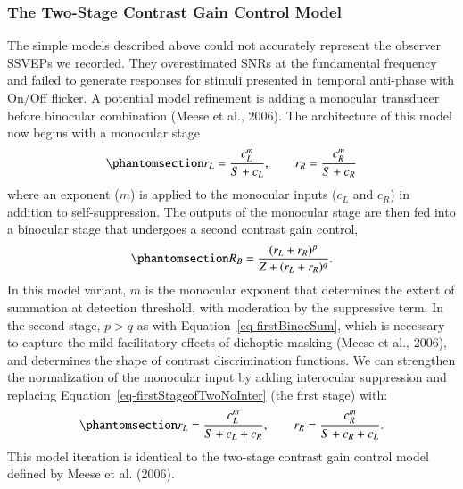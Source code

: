 \documentclass[review,
  12pt,
]{elsarticle}
\begin{document}
\subsubsection{The Two-Stage Contrast Gain Control
Model}\label{the-two-stage-contrast-gain-control-model}

The simple models described above could not accurately represent the
observer SSVEPs we recorded. They overestimated SNRs at the fundamental
frequency and failed to generate responses for stimuli presented in
temporal anti-phase with On/Off flicker. A potential model refinement is
adding a monocular transducer before binocular combination (Meese et
al., 2006). The architecture of this model now begins with a monocular
stage \begin{equation}\phantomsection\label{eq-firstStageofTwoNoInter}{
r_L = \frac{c_L^m}{S + c_L}, \qquad r_R = \frac{c_R^m}{S + c_R}
}\end{equation} where an exponent (\(m\)) is applied to the monocular
inputs (\(c_L\) and \(c_R\)) in addition to self-suppression. The
outputs of the monocular stage are then fed into a binocular stage that
undergoes a second contrast gain control,
\begin{equation}\phantomsection\label{eq-binocComb}{
R_{B} = \frac{(r_L+r_R)^p}{Z+(r_L+r_R)^q}.
}\end{equation} In this model variant, \(m\) is the monocular exponent
that determines the extent of summation at detection threshold, with
moderation by the suppressive term. In the second stage, \(p > q\) as
with Equation~\ref{eq-firstBinocSum}, which is necessary to capture the
mild facilitatory effects of dichoptic masking (Meese et al., 2006), and
determines the shape of contrast discrimination functions. We can
strengthen the normalization of the monocular input by adding
interocular suppression and replacing
Equation~\ref{eq-firstStageofTwoNoInter} (the first stage) with:
\begin{equation}\phantomsection\label{eq-firstStageofTwo}{
r_{L} = \frac{c_L^m}{S + c_L + c_R}, \qquad r_R = \frac{c_R^m}{S + c_R + c_L}.
}\end{equation} This model iteration is identical to the two-stage
contrast gain control model defined by Meese et al. (2006).
\end{document}
